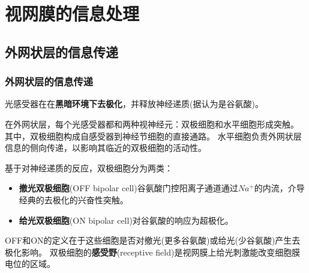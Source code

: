 \section{视网膜的信息处理}
\subsection{外网状层的信息传递}
\begin{frame}
    \frametitle{外网状层的信息传递\label{frame1}}

    光感受器在在\textbf{黑暗环境下去极化}，并释放神经递质(据认为是谷氨酸)。

    在外网状层，每个光感受器都和两种视神经元：双极细胞和水平细胞形成突触。
    其中，双极细胞构成自感受器到神经节细胞的直接通路。
    水平细胞负责外网状层信息的侧向传递，以影响其临近的双极细胞的活动性。

    基于对神经递质的反应，双极细胞分为两类：
    \begin{itemize}
        \item \textbf{撤光双极细胞}(OFF bipolar cell)谷氨酸门控阳离子通道通过$Na^+$的内流，介导经典的去极化的兴奋性突触。
        \item \textbf{给光双极细胞}(ON bipolar cell)对谷氨酸的响应为超极化。
    \end{itemize}
    OFF和ON的定义在于这些细胞是否对撤光(更多谷氨酸)或给光(少谷氨酸)产生去极化影响。
    双极细胞的\textbf{感受野}(receptive field)是视网膜上给光刺激能改变细胞膜电位的区域。
    
\end{frame}

